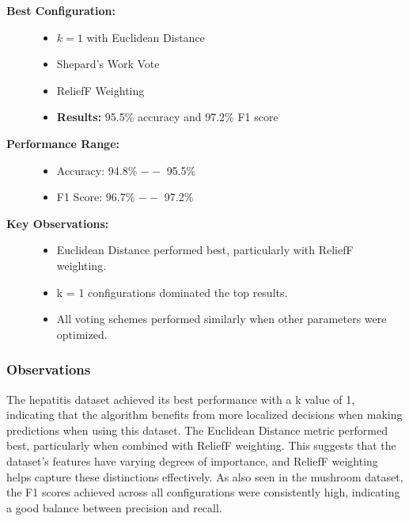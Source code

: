 \begin{description}
    \item[\textbf{Best Configuration:}]\leavevmode
        \begin{itemize}
            \item $k = 1$ with Euclidean Distance
            \item Shepard's Work Vote
            \item ReliefF Weighting
            \item \textbf{Results:} 95.5\% accuracy and 97.2\% F1 score
        \end{itemize}
    
    \item[\textbf{Performance Range:}]\leavevmode
        \begin{itemize}
            \item Accuracy: 94.8\% $--$ 95.5\%
            \item F1 Score: 96.7\% $--$ 97.2\%
        \end{itemize}
    
    \item[\textbf{Key Observations:}]\leavevmode
        \begin{itemize}
            \item Euclidean Distance performed best, particularly with ReliefF weighting.
            \item k = 1 configurations dominated the top results.
            \item All voting schemes performed similarly when other parameters were optimized.
        \end{itemize}
\end{description}

\subsubsection*{Observations}
The hepatitis dataset achieved its best performance with a k value of 1, indicating that the algorithm benefits from
more localized decisions when making predictions when using this dataset.
The Euclidean Distance metric performed best, particularly when combined with ReliefF weighting. This suggests that the dataset's features
have varying degrees of importance, and ReliefF weighting helps capture these distinctions effectively.
As also seen in the mushroom dataset, the F1 scores achieved across all configurations were consistently high,
indicating a good balance between precision and recall.


